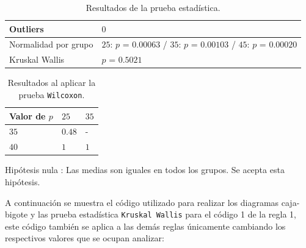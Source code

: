 \documentclass{article}
\begin{document}
\begin{table}[h!]
\centering
\caption{Resultados de la prueba estadística.}
\smallskip

\begin{tabular}{ |p{4cm}|p{8cm}|}
 \hline
 Outliers & $0$ \\
 \hline
 Normalidad por grupo & $25$: $p$ = $0.00063$ / $35$: $p$ = $0.00103$ / $45$: $p$ = $0.00020$ \\
 \hline
 Kruskal Wallis & $p$ = $0.5021$ \\
 \hline
\end{tabular}
\label{Cuadro17}
\end{table}

\begin{table}[h!]
\centering
\caption{Resultados al aplicar la prueba \texttt{Wilcoxon}.}
\smallskip

\begin{tabular}{|p{1.7cm}|p{1.7cm}|p{1.7cm}|}
 \hline
Valor de $p$ & $25$ & $35$ \\
 \hline
 $35$ & $0.48$ & -   \\
 \hline
 $40$ & $1$ & $1$  \\
 \hline
\end{tabular}
\label{Cuadro18}
\end{table}

Hipótesis nula : Las medias son iguales en todos los grupos. Se acepta esta hipótesis.
\newpage

A continuación se muestra el código utilizado para realizar los diagramas caja-bigote y las prueba estadística \texttt{Kruskal Wallis} para el código 1 de la regla 1, este código también se aplica a las demás reglas únicamente cambiando los respectivos valores que se ocupan analizar:
\end{document}
